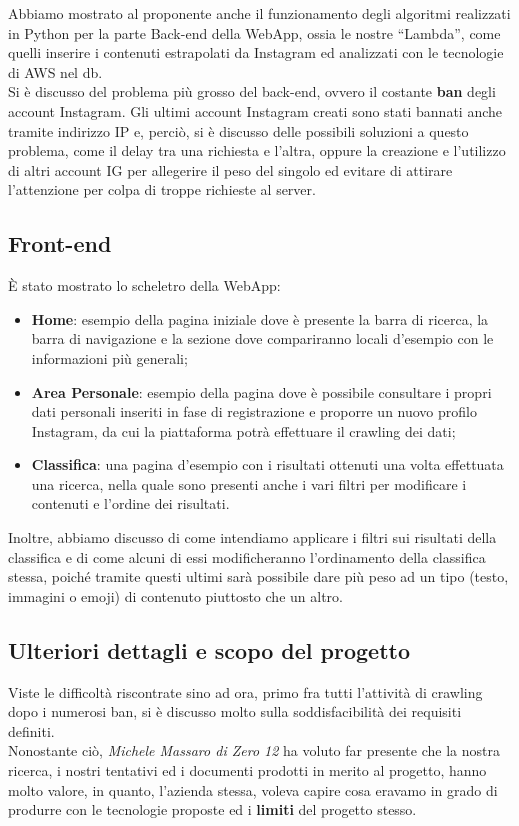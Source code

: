 Abbiamo mostrato al proponente anche il funzionamento degli algoritmi realizzati in Python per la parte Back-end della WebApp, ossia le nostre “Lambda”, come quelli inserire i contenuti estrapolati da Instagram ed analizzati con le tecnologie di AWS nel db. \\ 

Si è discusso del problema più grosso del back-end, ovvero il costante \textbf{ban} degli account Instagram. Gli ultimi account Instagram creati sono stati bannati anche tramite indirizzo IP e, perciò, si è discusso delle possibili soluzioni a questo problema, come il delay tra una richiesta e l'altra, oppure la creazione e l'utilizzo di altri account IG per allegerire il peso del singolo ed evitare di attirare l'attenzione per colpa di troppe richieste al server. 

\subsection{Front-end}
È stato mostrato lo scheletro della WebApp: 
\begin{itemize}
	\item {\textbf{Home}: esempio della pagina iniziale dove è presente la barra di ricerca, la barra di navigazione e la sezione dove compariranno locali d'esempio con le informazioni più generali;}
	\item {\textbf{Area Personale}: esempio della pagina dove è possibile consultare i propri dati personali inseriti in fase di registrazione e proporre un nuovo profilo Instagram, da cui la piattaforma potrà effettuare il crawling dei dati;}
	\item {\textbf{Classifica}: una pagina d'esempio con i risultati ottenuti una volta effettuata una ricerca, nella quale sono presenti anche i vari filtri per modificare i contenuti e l'ordine dei risultati.}
\end{itemize}
Inoltre, abbiamo discusso di come intendiamo applicare i filtri sui risultati della classifica e di come alcuni di essi modificheranno l'ordinamento della classifica stessa, poiché tramite questi ultimi sarà possibile dare più peso ad un tipo (testo, immagini o emoji) di contenuto piuttosto che un altro.

\subsection{Ulteriori dettagli e scopo del progetto}
Viste le difficoltà riscontrate sino ad ora, primo fra tutti l'attività di crawling dopo i numerosi ban, si è discusso molto sulla soddisfacibilità dei requisiti definiti. \\
Nonostante ciò, \textit{Michele Massaro di Zero 12} ha voluto far presente che la nostra ricerca, i nostri tentativi ed i documenti prodotti in merito al progetto, hanno molto valore, in quanto, l'azienda stessa, voleva capire cosa eravamo in grado di produrre con le tecnologie proposte ed i \textbf{limiti} del progetto stesso.

\pagebreak
